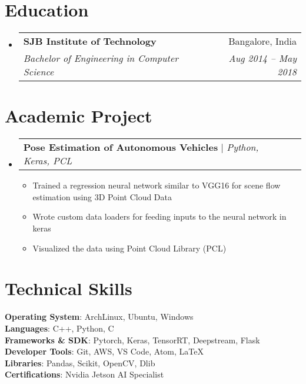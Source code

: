 \documentclass[letterpaper,11pt]{article}
\makeatletter
\newcommand{\resumeItem}[1]{
  \item\small{
    {#1 \vspace{-2pt}}
  }
}
\newcommand{\resumeSubheading}[4]{
  \vspace{-2pt}\item
    \begin{tabular*}{0.97\textwidth}[t]{l@{\extracolsep{\fill}}r}
      \textbf{#1} & #2 \\
      \textit{\small#3} & \textit{\small #4} \\
    \end{tabular*}\vspace{-7pt}
}
\newcommand{\resumeProjectHeading}[2]{
    \item
    \begin{tabular*}{0.97\textwidth}{l@{\extracolsep{\fill}}r}
      \small#1 & #2 \\
    \end{tabular*}\vspace{-7pt}
}
\newcommand{\resumeSubHeadingListStart}{\begin{itemize}[leftmargin=0.15in, label={}]}
\newcommand{\resumeSubHeadingListEnd}{\end{itemize}}
\newcommand{\resumeItemListStart}{\begin{itemize}}
\newcommand{\resumeItemListEnd}{\end{itemize}\vspace{-5pt}}
\makeatother
\begin{document}
\section{Education}
\resumeSubHeadingListStart
  \resumeSubheading
    {SJB Institute of Technology}{Bangalore, India}
    {Bachelor of Engineering in Computer Science}{Aug 2014 -- May 2018}
\resumeSubHeadingListEnd


\section{Academic Project}
    \resumeSubHeadingListStart
      \resumeProjectHeading
          {\textbf{Pose Estimation of Autonomous Vehicles} $|$ \emph{Python, Keras, PCL}}{}
          \resumeItemListStart
            \resumeItem{Trained a regression neural network similar to VGG16 for scene flow estimation using 3D Point Cloud Data}
            \resumeItem{Wrote custom data loaders for feeding inputs to the neural network in keras}
            \resumeItem{Visualized the data using Point Cloud Library (PCL)}
          \resumeItemListEnd
    \resumeSubHeadingListEnd


%
\section{Technical Skills}
 \begin{itemize}[leftmargin=0.15in, label={}]
    \small{\item{
     \textbf{Operating System}{: ArchLinux, Ubuntu, Windows} \\
     \textbf{Languages}{: C++, Python, C} \\
     \textbf{Frameworks \& SDK}{: Pytorch, Keras, TensorRT, Deepstream, Flask} \\
     \textbf{Developer Tools}{: Git, AWS, VS Code, Atom, LaTeX} \\
     \textbf{Libraries}{: Pandas, Scikit, OpenCV, Dlib} \\
     \textbf{Certifications}{: Nvidia Jetson AI Specialist}
    }}
 \end{itemize}


\end{document}
